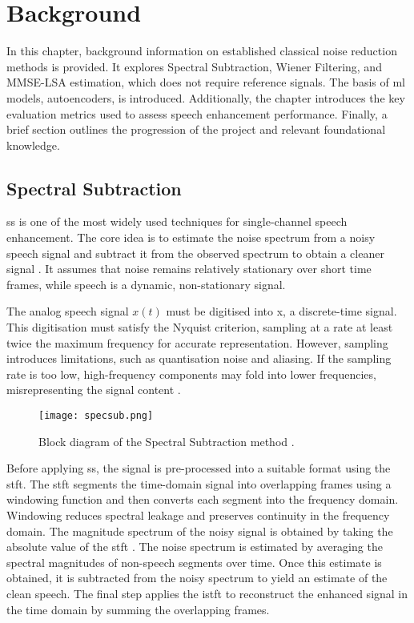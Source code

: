 \graphicspath{{content/chapters/2_background/figures/}}
\chapter{Background}
\label{chp:background}

In this chapter, background information on established classical noise reduction methods is provided. It explores Spectral Subtraction, Wiener Filtering, and MMSE-LSA estimation, which does not require reference signals. The basis of \gls{ml} models, autoencoders, is introduced. Additionally, the chapter introduces the key evaluation metrics used to assess speech enhancement performance. Finally, a brief section outlines the progression of the project and relevant foundational knowledge.

\section{Spectral Subtraction}
\label{sec:spectral_subtraction}

\gls{ss} is one of the most widely used techniques for single-channel speech enhancement. The core idea is to estimate the noise spectrum from a noisy speech signal and subtract it from the observed spectrum to obtain a cleaner signal \cite{loizou2013speech}. It assumes that noise remains relatively stationary over short time frames, while speech is a dynamic, non-stationary signal.

The analog speech signal \(x(t)\) must be digitised into \gls{x}, a discrete-time signal. This digitisation must satisfy the Nyquist criterion, sampling at a rate at least twice the maximum frequency for accurate representation. However, sampling introduces limitations, such as quantisation noise and aliasing. If the sampling rate is too low, high-frequency components may fold into lower frequencies, misrepresenting the signal content \cite{loizou2013speech}.

\begin{figure}[h]
    \centering
    \texttt{[image: specsub.png]}
    \caption{\label{fig:SSBlock} Block diagram of the Spectral Subtraction method \cite{dubey2016evaluation}.}
\end{figure}

Before applying \gls{ss}, the signal is pre-processed into a suitable format using the \gls{stft}. The \gls{stft} segments the time-domain signal into overlapping frames using a windowing function and then converts each segment into the frequency domain. Windowing reduces spectral leakage and preserves continuity in the frequency domain. The magnitude spectrum of the noisy signal is obtained by taking the absolute value of the \gls{stft} \cite{dubey2016evaluation}. The noise spectrum is estimated by averaging the spectral magnitudes of non-speech segments over time. Once this estimate is obtained, it is subtracted from the noisy spectrum to yield an estimate of the clean speech. The final step applies the \gls{istft} to reconstruct the enhanced signal in the time domain by summing the overlapping frames.

